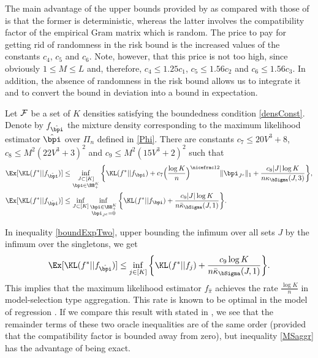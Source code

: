 The main advantage of the upper bounds provided by  as compared with those of
 is that the former is deterministic, whereas the latter involves the
compatibility factor of the empirical Gram matrix which is random. The price to pay for getting
rid of randomness in the risk bound is the increased values of the constants $c_4$, $c_5$ and $c_6$.
Note, however, that this price is not too high, since obviously $1\le M\le L$ and, therefore,
$c_4\le 1.25 c_1$, $c_5\le 1.56 c_2$ and $c_6\le 1.56 c_3$. In addition, the absence of randomness
in the risk bound allows us to integrate it and to convert the bound in deviation into a bound
in expectation.

\begin{theorem}
\label{th:expectation}
Let $\cal F$ be a set of $K$ densities satisfying the boundedness condition \eqref{densConst}.
Denote by $f_{\hat\bpi}$ the mixture density corresponding to the maximum likelihood estimator
$\hat\bpi$ over $\Pi_n$ defined in \eqref{Phi}. There are constants $c_7\le 20V^3 + 8$,
$c_8\le M^2(22V^3+3)^2$ and $c_9\le M^2(15V^3+2)^2$ such that
\begin{align}
  \Ex[\KL(f^*|| f_{\hat\bpi})] &\leq \inf_{\substack{J\subset [K]\\ \bpi \in \BB_+^K}}
  \bigg\{ \KL(f^*|| f_{\bpi}) + c_7\Big(\frac{\log K}{n}\Big)^{\nicefrac12} \|\bpi_{J^c}\|_1 +
			\frac{c_8|J|\log K}{n\kappa_{\bSigma}(J,3)} \bigg\},\label{boundExpOne}\\
 \Ex[\KL(f^*|| f_{\hat\bpi})] &\leq \inf_{J\subset [K]}\inf_{\substack{\bpi \in \BB_+^K\\
		\bpi_{J^c}=0}} \bigg\{ \KL(f^*|| f_{\bpi}) +
			\frac{c_9|J|\log K}{n\bar\kappa_{\bSigma}(J,1)} \bigg\}.\label{boundExpTwo}
\end{align}
\end{theorem}

In inequality \eqref{boundExpTwo}, upper bounding the infimum over all sets $J$ by the infimum
over the singletons, we get
\begin{equation}
 \Ex[\KL(f^*|| f_{\hat\bpi})] \leq \inf_{j\in [K]}\bigg\{ \KL(f^*|| f_j) +
			\frac{c_9\log K}{n\bar\kappa_{\bSigma}(J,1)} \bigg\}.\label{MSaggr}
\end{equation}
This implies that the maximum likelihood estimator $f_{\hat\pi}$ achieves the
rate $\frac{\log K}{n}$ in model-selection type aggregation. This rate is known
to be optimal in the model of regression \citep{Rigollet12}. If we compare this result
with  stated in , we see that the remainder terms
of these two oracle inequalities are of the same order (provided that the compatibility
factor is bounded away from zero), but inequality \eqref{MSaggr} has the advantage
of being exact.

